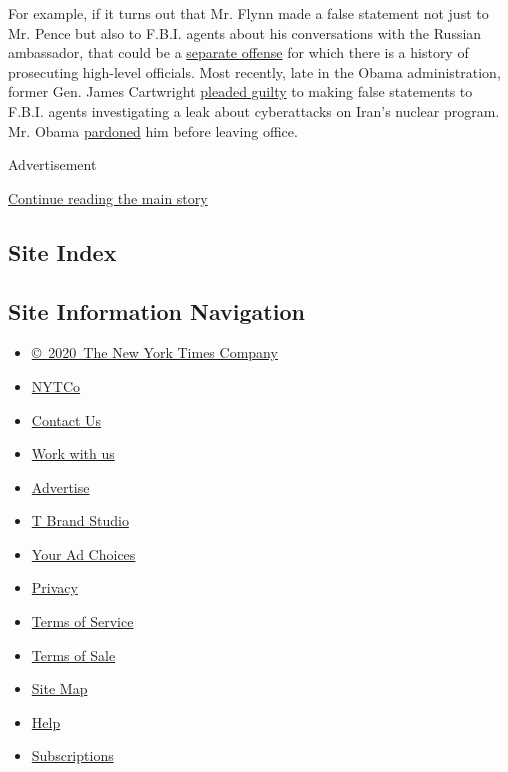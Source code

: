 For example, if it turns out that Mr. Flynn made a false statement not
just to Mr. Pence but also to F.B.I. agents about his conversations with
the Russian ambassador, that could be a
\href{https://www.law.cornell.edu/uscode/text/18/1001}{separate offense}
for which there is a history of prosecuting high-level officials. Most
recently, late in the Obama administration, former Gen. James Cartwright
\href{https://www.nytimes.com/2016/10/18/us/marine-general-james-cartwright-leak-fbi.html}{pleaded
guilty} to making false statements to F.B.I. agents investigating a leak
about cyberattacks on Iran's nuclear program. Mr. Obama
\href{https://www.nytimes.com/2017/01/17/us/politics/obama-pardons-james-cartwright-general-who-lied-to-fbi-in-leak-case.html}{pardoned}
him before leaving office.

Advertisement

\protect\hyperlink{after-bottom}{Continue reading the main story}

\hypertarget{site-index}{%
\subsection{Site Index}\label{site-index}}

\hypertarget{site-information-navigation}{%
\subsection{Site Information
Navigation}\label{site-information-navigation}}

\begin{itemize}
\tightlist
\item
  \href{https://help.nytimes.com/hc/en-us/articles/115014792127-Copyright-notice}{©~2020~The
  New York Times Company}
\end{itemize}

\begin{itemize}
\tightlist
\item
  \href{https://www.nytco.com/}{NYTCo}
\item
  \href{https://help.nytimes.com/hc/en-us/articles/115015385887-Contact-Us}{Contact
  Us}
\item
  \href{https://www.nytco.com/careers/}{Work with us}
\item
  \href{https://nytmediakit.com/}{Advertise}
\item
  \href{http://www.tbrandstudio.com/}{T Brand Studio}
\item
  \href{https://www.nytimes.com/privacy/cookie-policy\#how-do-i-manage-trackers}{Your
  Ad Choices}
\item
  \href{https://www.nytimes.com/privacy}{Privacy}
\item
  \href{https://help.nytimes.com/hc/en-us/articles/115014893428-Terms-of-service}{Terms
  of Service}
\item
  \href{https://help.nytimes.com/hc/en-us/articles/115014893968-Terms-of-sale}{Terms
  of Sale}
\item
  \href{https://spiderbites.nytimes.com}{Site Map}
\item
  \href{https://help.nytimes.com/hc/en-us}{Help}
\item
  \href{https://www.nytimes.com/subscription?campaignId=37WXW}{Subscriptions}
\end{itemize}
